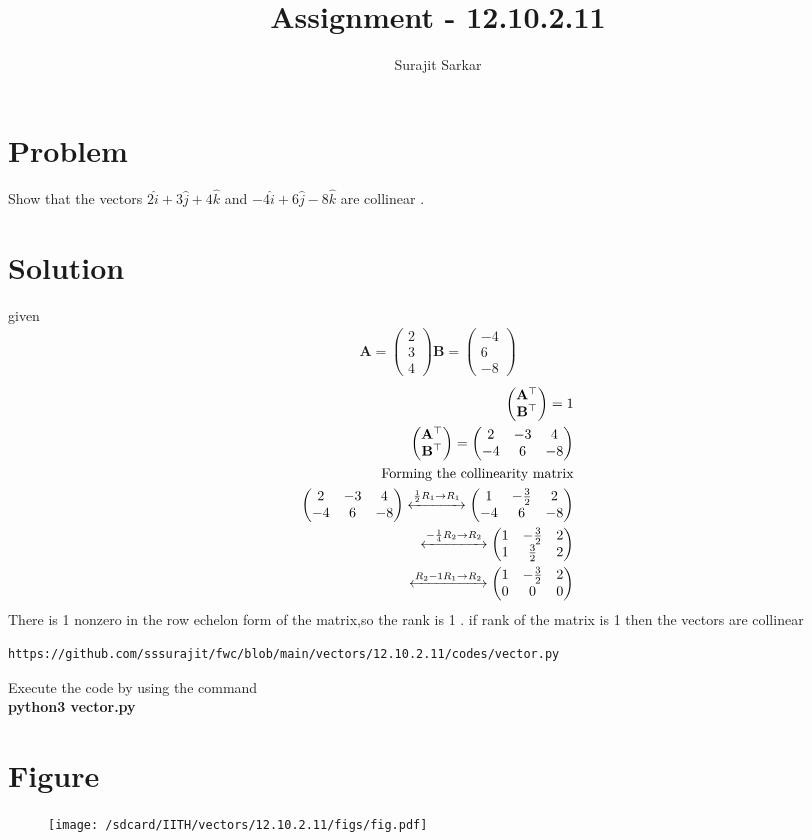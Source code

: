 \documentclass[journal,12pt,twocolumn]{IEEEtran}
\title{\mytitle}
\title{
Assignment - 12.10.2.11
}
\author{Surajit Sarkar}
\newcommand{\myvec}[1]{\ensuremath{\begin{pmatrix}#1\end{pmatrix}}}
\let\vec\mathbf
\begin{document}
\maketitle
\tableofcontents
\bigskip
\section{\textbf{Problem}}
Show that the vectors $2\hat{i}+3\hat{j}+4\hat{k}$ and $-4\hat{i}+6\hat{j}-8\hat{k}$ are collinear .
\section{\textbf{Solution}}
given
\begin{align}
	\vec{A}=\myvec{2\\3\\4}
	\vec{B}=\myvec{-4\\6\\-8}
\end{align}
\begin{align}
    \myvec{\vec{A}^{\top}\\ \vec{B}^{\top}}=1\\
\myvec{\vec{A}^{\top}\\ \vec{B}^{\top}}=\myvec{2&-3&4\\-4&6&-8}\\
\text{Forming the collinearity matrix}\\
\myvec{2&-3&4\\-4&6&-8} \xleftrightarrow{\frac{1}{2}R_1\to R_1}\myvec{1&-\frac{3}{2}&2\\-4&6&-8}\\
\xleftrightarrow{-\frac{1}{4}R_2\to R_2}\myvec{1&-\frac{3}{2}&2\\1&\frac{3}{2}&2}\\
\xleftrightarrow{R_2-1R_1\to R_2}\myvec{1&-\frac{3}{2}&2\\0&0&0}
\end{align}
There is 1 nonzero in the row echelon form of the matrix,so the rank is 1 .
if rank of the matrix is 1 then the vectors are collinear
\begin{lstlisting}
https://github.com/sssurajit/fwc/blob/main/vectors/12.10.2.11/codes/vector.py
\end{lstlisting}
Execute the code by using the command\\
\textbf{python3 vector.py}
\section{\textbf{Figure}}
\begin{figure}[!ht]
    \centering
\texttt{[image: /sdcard/IITH/vectors/12.10.2.11/figs/fig.pdf]}
\caption{}
\label{fig:vec}
\end{figure}
\end{document}
